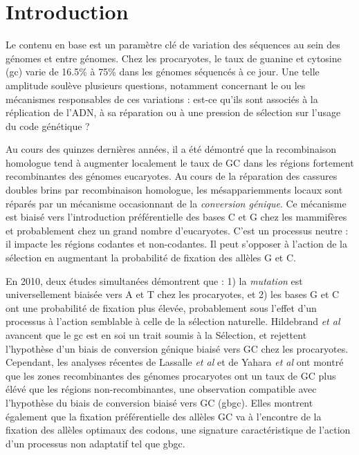 \section*{Introduction}
\label{sec:introduction}

Le contenu en base est un paramètre clé de variation des séquences au sein des
génomes et entre génomes. Chez les procaryotes, le taux de guanine et cytosine
(\ac{gc}) varie de 16.5\% à 75\% dans les génomes séquencés à ce jour. Une telle
amplitude soulève plusieurs questions, notamment concernant le ou les mécanismes
responsables de ces variations : est-ce qu'ils sont associés à la réplication de
l'ADN, à sa réparation ou à une pression de sélection sur l'usage du code
génétique ?

Au cours des quinzes dernières années, il a été démontré que la recombinaison
homologue tend à augmenter localement le taux de GC dans les régions fortement
recombinantes des génomes
eucaryotes\cite{duret_biased_2009,lesecque_gc-biased_2013,williams_non-crossover_2015}.
Au cours de la réparation des cassures doubles brins par recombinaison
homologue, les mésappariemments locaux sont réparés par un mécanisme
occasionnant de la \emph{conversion génique}\cite{chen_gene_2007}. Ce mécanisme
est biaisé vers l'introduction préférentielle des bases C et G chez les
mammifères et probablement chez un grand nombre
d'eucaryotes\cite{pessia_evidence_2012}. C'est un processus neutre : il impacte
les régions codantes et non-codantes. Il peut s'opposer à l'action de la
sélection en augmentant la probabilité de fixation des allèles G et
C\cite{ratnakumar_detecting_2010}.

En 2010, deux études simultanées\cite{hildebrand_evidence_2010,
  hershberg_evidence_2010} démontrent que : 1) la \emph{mutation} est
universellement biaisée vers A et T chez les procaryotes, et 2) les bases G et C
ont une probabilité de fixation plus élevée, probablement sous l'effet d'un
processus à l'action semblable à celle de la sélection naturelle. Hildebrand
\emph{et al} avancent que le \ac{gc} est en soi un trait soumis à la Sélection,
et rejettent l'hypothèse d'un biais de conversion génique biaisé vers GC chez
les procaryotes. Cependant, les analyses récentes de Lassalle \emph{et al}
\cite{lassalle_gc-content_2015} et de Yahara \emph{et
  al}\cite{yahara_landscape_2016} ont montré que les zones recombinantes des
génomes procaryotes ont un taux de GC plus élévé que les régions
non-recombinantes, une observation compatible avec l'hypothèse du biais de
conversion biaisé vers GC (\ac{gbgc}). Elles montrent également que la fixation
préférentielle des allèles GC va à l'encontre de la fixation des allèles
optimaux des codons, une signature caractéristique de l'action d'un processus
non adaptatif tel que \ac{gbgc}.